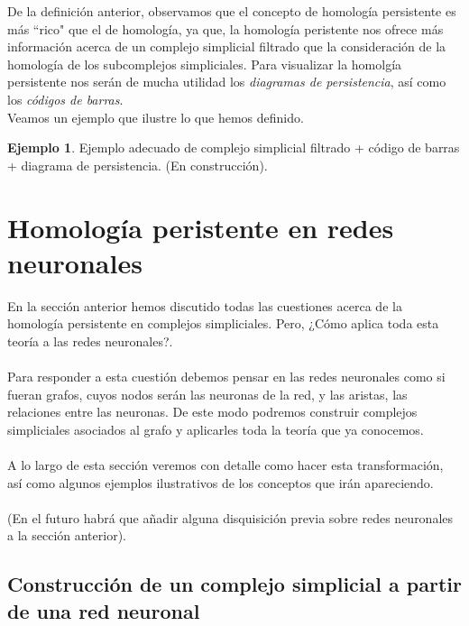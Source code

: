 \documentclass[12pt]{article}
\numberwithin{equation}{section}
\theoremstyle{definition}
\newtheorem{ejem}{Ejemplo}
\theoremstyle{remark}
\theoremstyle{plain}
\begin{document}
		

		De la definición anterior, observamos que el concepto de homología persistente es más ``rico" que el de homología, ya que, la homología peristente nos ofrece más
		información acerca de un complejo simplicial filtrado que la consideración de la homología de los subcomplejos simpliciales. Para visualizar la homolgía persistente
		nos serán de mucha utilidad los \textit{diagramas de persistencia}, así como los \textit{códigos de barras}.\\
		Veamos un ejemplo que ilustre lo que hemos definido.
		
		\begin{ejem}	
			Ejemplo adecuado de complejo simplicial filtrado + código de barras + diagrama de persistencia. (En construcción).
		\end{ejem}

	\section{Homología peristente en redes neuronales}

		En la sección anterior hemos discutido todas las cuestiones acerca de la homología persistente en complejos simpliciales. Pero, ¿Cómo aplica toda esta teoría a las redes neuronales?. \\
		\\
		Para responder a esta cuestión debemos pensar en las redes neuronales como si fueran grafos, cuyos nodos serán las neuronas de la red, y las aristas, las relaciones entre las neuronas.
		De este modo podremos construir complejos simpliciales asociados al grafo y aplicarles toda la teoría que ya conocemos. \\
		\\
		A lo largo de esta sección veremos con detalle como hacer esta transformación, así como algunos ejemplos ilustrativos de los conceptos que irán apareciendo.\\
		\\
		(En el futuro habrá que añadir alguna disquisición previa sobre redes neuronales a la sección anterior).

	\subsection{Construcción de un complejo simplicial a partir de una red neuronal}
\end{document}
